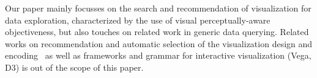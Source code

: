 \par Our paper mainly focusses on the search and recommendation of visualization for data exploration, characterized by the use of visual perceptually-aware objectiveness, but also touches on related work in generic data querying. Related works on recommendation and automatic selection of the visualization design and encoding~\cite{Wongsuphasawat2017,Mackinlay2007} as well as frameworks and grammar for interactive visualization (Vega, D3) is out of the scope of this paper.

